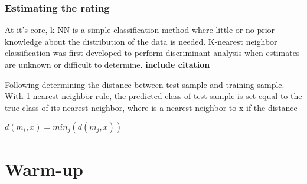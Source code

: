 \documentclass{report}
\begin{document}
\subsubsection*{Estimating the rating}
At it's core, k-NN is a simple classification method where little or no prior knowledge about the distribution of the data is needed. K-nearest neighbor classification was first developed to perform discriminant analysis when estimates are unknown or difficult to determine. \textbf{include citation}
	
		
Following determining the distance between test sample and training sample. 
With 1 nearest neighbor rule, the predicted class of test sample is set equal to the true class of its nearest neighbor, where is a nearest neighbor to x if the distance 
		
$d(m_{i},x) = min_{j}(d(m_{j},x))$

		
%		
%		
%			
%			
%			




\section*{Warm-up}
\end{document}
